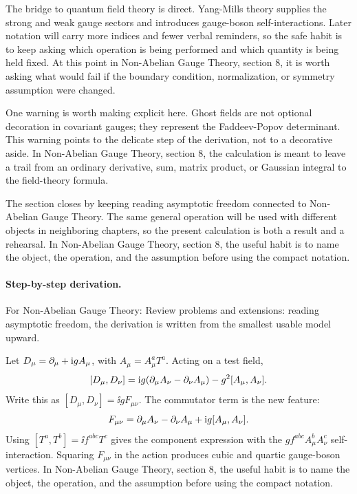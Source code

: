 The bridge to quantum field theory is direct.  Yang-Mills theory supplies the strong and weak gauge sectors and introduces gauge-boson self-interactions.  Later notation will carry more indices and fewer verbal reminders, so the safe habit is to keep asking which operation is being performed and which quantity is being held fixed.  At this point in Non-Abelian Gauge Theory, section 8, it is worth asking what would fail if the boundary condition, normalization, or symmetry assumption were changed.

One warning is worth making explicit here.  Ghost fields are not optional decoration in covariant gauges; they represent the Faddeev-Popov determinant.  This warning points to the delicate step of the derivation, not to a decorative aside.  In Non-Abelian Gauge Theory, section 8, the calculation is meant to leave a trail from an ordinary derivative, sum, matrix product, or Gaussian integral to the field-theory formula.

The section closes by keeping reading asymptotic freedom connected to Non-Abelian Gauge Theory.  The same general operation will be used with different objects in neighboring chapters, so the present calculation is both a result and a rehearsal.  In Non-Abelian Gauge Theory, section 8, the useful habit is to name the object, the operation, and the assumption before using the compact notation.



\paragraph{Step-by-step derivation.}

For Non-Abelian Gauge Theory: Review problems and extensions: reading asymptotic freedom, the derivation is written from the smallest usable model upward.

Let \(D_\mu=\partial_\mu+\mathrm i gA_\mu\), with \(A_\mu=A_\mu^aT^a\).  Acting on a test field,
\[
  [D_\mu,D_\nu]
  =
  \mathrm i g(\partial_\mu A_\nu-\partial_\nu A_\mu)-g^2[A_\mu,A_\nu].
\]
Write this as \([D_\mu,D_\nu]=\ii gF_{\mu\nu}\).  The commutator term is the new feature:
\[
  F_{\mu\nu}=\partial_\mu A_\nu-\partial_\nu A_\mu+\mathrm i g[A_\mu,A_\nu].
\]
Using \([T^a,T^b]=\ii f^{abc}T^c\) gives the component expression with the \(gf^{abc}A_\mu^bA_\nu^c\) self-interaction.  Squaring \(F_{\mu\nu}\) in the action produces cubic and quartic gauge-boson vertices.  In Non-Abelian Gauge Theory, section 8, the useful habit is to name the object, the operation, and the assumption before using the compact notation.

